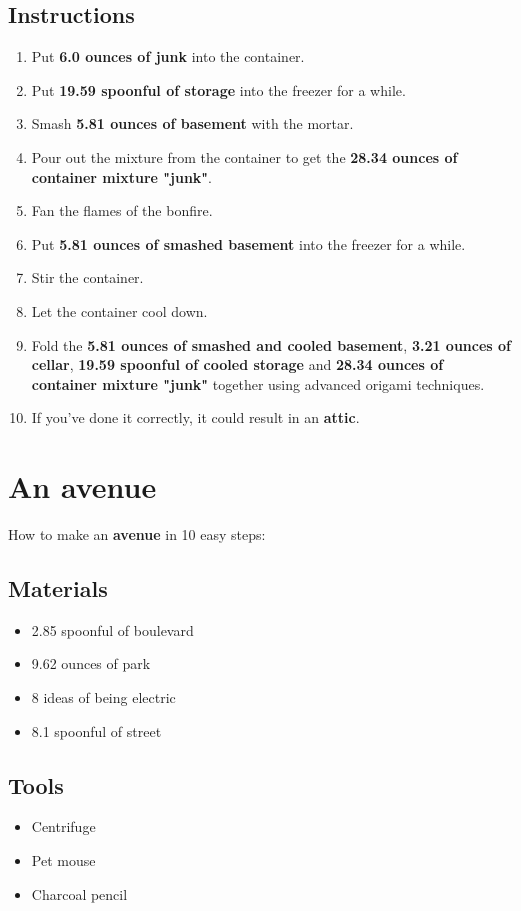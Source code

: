 \documentclass{article}
\begin{document}
\subsection{Instructions}\begin{enumerate}
\item 
Put \textbf{6.0 ounces of junk} into the container.
\item 
Put \textbf{19.59 spoonful of storage} into the freezer for a while.
\item 
Smash \textbf{5.81 ounces of basement} with the mortar.
\item 
Pour out the mixture from the container to get the \textbf{28.34 ounces of container mixture "junk"}.
\item 
Fan the flames of the bonfire.
\item 
Put \textbf{5.81 ounces of smashed basement} into the freezer for a while.
\item 
Stir the container.
\item 
Let the container cool down.
\item 
Fold the \textbf{5.81 ounces of smashed and cooled basement}, \textbf{3.21 ounces of cellar}, \textbf{19.59 spoonful of cooled storage} and \textbf{28.34 ounces of container mixture "junk"} together using advanced origami techniques.
\item 
If you've done it correctly, it could result in an \textbf{attic}.
\end{enumerate}
\newpage
\section{An avenue}How to make an \textbf{avenue} in 10 easy steps:

\subsection{Materials}\begin{itemize}
\item 
2.85 spoonful of boulevard
\item 
9.62 ounces of park
\item 
8 ideas of being electric
\item 
8.1 spoonful of street
\end{itemize}
\subsection{Tools}\begin{itemize}
\item 
Centrifuge
\item 
Pet mouse
\item 
Charcoal pencil
\end{itemize}
\end{document}
